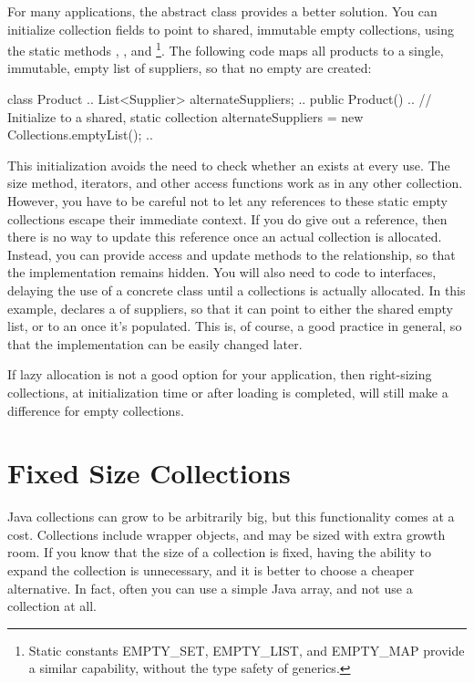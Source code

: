 For many applications, the abstract
 class provides a better solution. You can initialize
collection fields to point to shared, immutable empty collections, using the
static methods , , and 
\footnote{Static constants EMPTY\_SET, EMPTY\_LIST, and EMPTY\_MAP provide a similar capability,
without the type safety of generics.}.
The following code
maps all products to a single, immutable, empty list of suppliers, so that no
empty  are created:

\begin{shortlisting}
class Product {
	.. 
	List<Supplier> alternateSuppliers;
	..
	public Product() {
		..
		// Initialize to a shared, static collection
		alternateSuppliers = new Collections.emptyList();
		..
	}
}
\end{shortlisting}

This initialization avoids the need to check whether an 
exists at every use. The size method, iterators, and other access functions
work as in any other collection.
However, you have to be careful not to let any references to these static empty
collections escape their immediate context. If you do give out a reference, 
then there is no way to update this reference once an actual collection is
allocated. Instead, you can provide access and update methods to the relationship,
so that the implementation remains hidden.
You will also need to code to interfaces, delaying the use of a concrete class
until a collections is actually allocated. In this example, 
declares a  of suppliers, so that it can point to either the shared
empty list, or to an  once it's populated.
This is, of course, a good practice in general, so that the implementation can
be easily changed later.

If lazy allocation is not a good option for your application, then
right-sizing collections, at initialization time or after loading is
completed, will still make a difference for empty collections.

\section{Fixed Size Collections}

Java collections can grow to be
arbitrarily big, but this functionality comes at a cost.
Collections include wrapper objects, and 
may be sized with extra growth room. If
you know that the size of a collection is fixed, having the ability to expand
the collection is unnecessary, and it is better to choose a cheaper alternative.
In fact, often you can use a
simple Java array, and not use a collection at all.  

